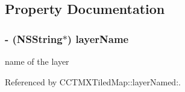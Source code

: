 \subsection{Property Documentation}
\hypertarget{interface_c_c_t_m_x_layer_ae62640f00d84efb58df4eb90e3913700}{
\subsubsection[{layer\-Name}]{\setlength{\rightskip}{0pt plus 5cm}-\/ (N\-S\-String$\ast$) {\bf layer\-Name}}}\label{interface_c_c_t_m_x_layer_ae62640f00d84efb58df4eb90e3913700}
name of the layer 

Referenced by C\-C\-T\-M\-X\-Tiled\-Map\-::layer\-Named\-:.


